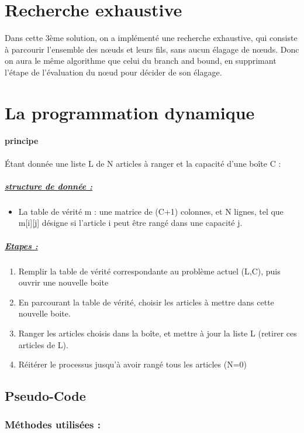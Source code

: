 \documentclass[12pt]{article}
\begin{document}
\section{Recherche exhaustive }
Dans cette 3ème solution, on a implémenté une recherche exhaustive, qui consiste à parcourir l’ensemble des nœuds et leurs fils, sans aucun élagage de nœuds. Donc on aura le même algorithme que celui du branch and bound, en supprimant l’étape de l’évaluation du nœud pour décider de son élagage.  
\section{La programmation dynamique }
\paragraph{principe }
Étant donnée une liste L de N articles à ranger et la capacité d’une boîte C :
\subparagraph{\underline{structure de donnée :}}
\begin{itemize}
    \item La table de vérité m : une matrice de (C+1) colonnes, et N lignes, tel que m[i][j] désigne si l’article i peut être rangé dans une capacité j.
\end{itemize}
\subparagraph{\underline{Etapes :}}
\begin{enumerate}
    \item Remplir la table de vérité correspondante au problème actuel (L,C), puis ouvrir une nouvelle boite
    \item En parcourant la table de vérité, choisir les articles à mettre dans cette nouvelle boite.
    \item Ranger les articles choisis dans la boîte, et mettre à jour la liste L (retirer ces articles de L). 
    \item Réitérer le processus jusqu’à avoir rangé tous les articles (N=0) 
\end{enumerate}
\subsection{Pseudo-Code}
\subsubsection{Méthodes utilisées :}
\end{document}
